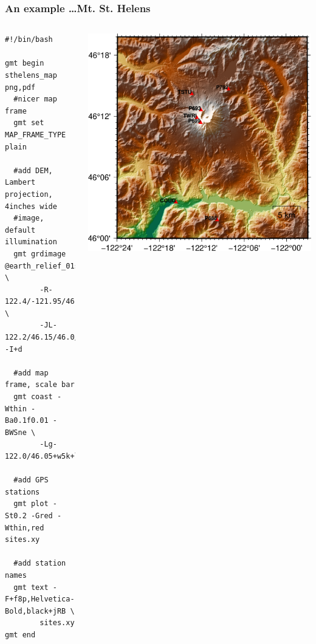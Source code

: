 \documentclass[unknownkeysallowed]{beamer}
\begin{document}
\begin{frame}[fragile=singleslide]
\frametitle{An example \dots Mt. St. Helens}
	\begin{columns}
		\tiny{
		\begin{verbatim}
#!/bin/bash

gmt begin sthelens_map png,pdf
  #nicer map frame
  gmt set MAP_FRAME_TYPE plain

  #add DEM, Lambert projection, 4inches wide 
  #image, default illumination
  gmt grdimage @earth_relief_01s \
        -R-122.4/-121.95/46.0/46.33 \
        -JL-122.2/46.15/46.0/46.3/4i -I+d

  #add map frame, scale bar
  gmt coast -Wthin -Ba0.1f0.01 -BWSne \
        -Lg-122.0/46.05+w5k+l+c46.1

  #add GPS stations
  gmt plot -St0.2 -Gred -Wthin,red sites.xy

  #add station names
  gmt text -F+f8p,Helvetica-Bold,black+jRB \
        sites.xy
gmt end		
		\end{verbatim}
}
		\begin{center}
				\includegraphics[width=\textwidth]{../figures/gmt_sthelens_map_05.png}	
		\end{center}
	\end{columns}
\end{frame}
\end{document}
